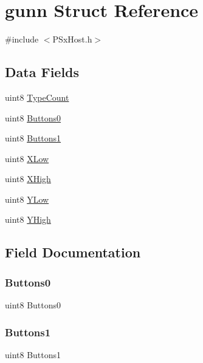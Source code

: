 \hypertarget{structgunn}{}\section{gunn Struct Reference}
\label{structgunn}


{\ttfamily \#include $<$P\+Sx\+Host.\+h$>$}

\subsection*{Data Fields}
\begin{DoxyCompactItemize}
\item 
uint8 \mbox{\hyperlink{structgunn_af8950e4872b4b4b5dd2b837ac45a0603}{Type\+Count}}
\item 
uint8 \mbox{\hyperlink{structgunn_a0d9f38dcaa6d84c7fc78d434b839f259}{Buttons0}}
\item 
uint8 \mbox{\hyperlink{structgunn_a17ebb8fd1844de7d6545c9f96194d300}{Buttons1}}
\item 
uint8 \mbox{\hyperlink{structgunn_a26f5cf872ef3b8114968d7150d71e36e}{X\+Low}}
\item 
uint8 \mbox{\hyperlink{structgunn_a18095ef6ff08aaa798cef1c35376c781}{X\+High}}
\item 
uint8 \mbox{\hyperlink{structgunn_a484f771806ab7aa95378ccac10b3ddba}{Y\+Low}}
\item 
uint8 \mbox{\hyperlink{structgunn_aa1a96b187c7a76f29513186243075f2b}{Y\+High}}
\end{DoxyCompactItemize}


\subsection{Field Documentation}
\mbox{\label{structgunn_a0d9f38dcaa6d84c7fc78d434b839f259}} 
\subsubsection{\texorpdfstring{Buttons0}{Buttons0}}
{\footnotesize\ttfamily uint8 Buttons0}

\mbox{\label{structgunn_a17ebb8fd1844de7d6545c9f96194d300}} 
\subsubsection{\texorpdfstring{Buttons1}{Buttons1}}
{\footnotesize\ttfamily uint8 Buttons1}

